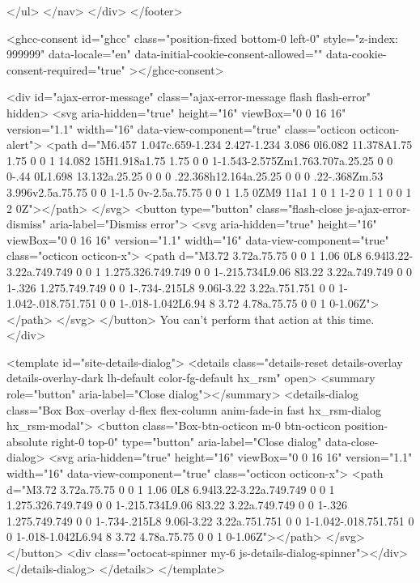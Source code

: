 {{{      </ul>
    </nav>
  </div>
</footer>



    <ghcc-consent id="ghcc" class="position-fixed bottom-0 left-0" style="z-index: 999999"
      data-locale="en"
      data-initial-cookie-consent-allowed=""
      data-cookie-consent-required="true"
    ></ghcc-consent>



  <div id="ajax-error-message" class="ajax-error-message flash flash-error" hidden>
    <svg aria-hidden="true" height="16" viewBox="0 0 16 16" version="1.1" width="16" data-view-component="true" class="octicon octicon-alert">
    <path d="M6.457 1.047c.659-1.234 2.427-1.234 3.086 0l6.082 11.378A1.75 1.75 0 0 1 14.082 15H1.918a1.75 1.75 0 0 1-1.543-2.575Zm1.763.707a.25.25 0 0 0-.44 0L1.698 13.132a.25.25 0 0 0 .22.368h12.164a.25.25 0 0 0 .22-.368Zm.53 3.996v2.5a.75.75 0 0 1-1.5 0v-2.5a.75.75 0 0 1 1.5 0ZM9 11a1 1 0 1 1-2 0 1 1 0 0 1 2 0Z"></path>
</svg>
    <button type="button" class="flash-close js-ajax-error-dismiss" aria-label="Dismiss error">
      <svg aria-hidden="true" height="16" viewBox="0 0 16 16" version="1.1" width="16" data-view-component="true" class="octicon octicon-x">
    <path d="M3.72 3.72a.75.75 0 0 1 1.06 0L8 6.94l3.22-3.22a.749.749 0 0 1 1.275.326.749.749 0 0 1-.215.734L9.06 8l3.22 3.22a.749.749 0 0 1-.326 1.275.749.749 0 0 1-.734-.215L8 9.06l-3.22 3.22a.751.751 0 0 1-1.042-.018.751.751 0 0 1-.018-1.042L6.94 8 3.72 4.78a.75.75 0 0 1 0-1.06Z"></path>
</svg>
    </button>
    You can’t perform that action at this time.
  </div>

    <template id="site-details-dialog">
  <details class="details-reset details-overlay details-overlay-dark lh-default color-fg-default hx_rsm" open>
    <summary role="button" aria-label="Close dialog"></summary>
    <details-dialog class="Box Box--overlay d-flex flex-column anim-fade-in fast hx_rsm-dialog hx_rsm-modal">
      <button class="Box-btn-octicon m-0 btn-octicon position-absolute right-0 top-0" type="button" aria-label="Close dialog" data-close-dialog>
        <svg aria-hidden="true" height="16" viewBox="0 0 16 16" version="1.1" width="16" data-view-component="true" class="octicon octicon-x">
    <path d="M3.72 3.72a.75.75 0 0 1 1.06 0L8 6.94l3.22-3.22a.749.749 0 0 1 1.275.326.749.749 0 0 1-.215.734L9.06 8l3.22 3.22a.749.749 0 0 1-.326 1.275.749.749 0 0 1-.734-.215L8 9.06l-3.22 3.22a.751.751 0 0 1-1.042-.018.751.751 0 0 1-.018-1.042L6.94 8 3.72 4.78a.75.75 0 0 1 0-1.06Z"></path>
</svg>
      </button>
      <div class="octocat-spinner my-6 js-details-dialog-spinner"></div>
    </details-dialog>
  </details>
</template>

}}}
